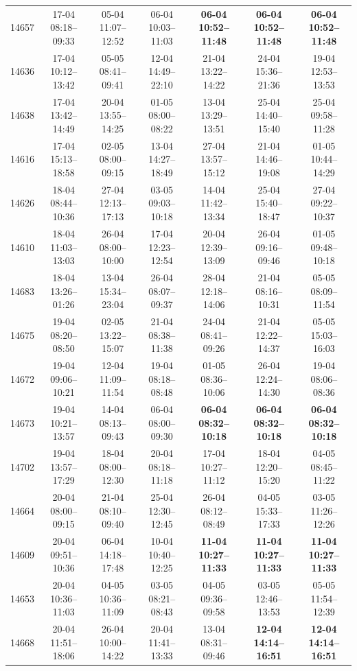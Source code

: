 \begin{table}[htbp]
\begin{tabular}{|r|c|c|c|c|c|c|}
14657 & 17-04 08:18--09:33 & 05-04 11:07--12:52 & 06-04 10:03--11:03 & \textbf{06-04 10:52--11:48} & \textbf{06-04 10:52--11:48} & \textbf{06-04 10:52--11:48} \\ 
14636 & 17-04 10:12--13:42 & 05-05 08:41--09:41 & 12-04 14:49--22:10 & 21-04 13:22--14:22 & 24-04 15:36--21:36 & 19-04 12:53--13:53 \\ 
14638 & 17-04 13:42--14:49 & 20-04 13:55--14:25 & 01-05 08:00--08:22 & 13-04 13:29--13:51 & 25-04 14:40--15:40 & 25-04 09:58--11:28 \\ 
14616 & 17-04 15:13--18:58 & 02-05 08:00--09:15 & 13-04 14:27--18:49 & 27-04 13:57--15:12 & 21-04 14:46--19:08 & 01-05 10:44--14:29 \\ 
14626 & 18-04 08:44--10:36 & 27-04 12:13--17:13 & 03-05 09:03--10:18 & 14-04 11:42--13:34 & 25-04 15:40--18:47 & 27-04 09:22--10:37 \\ 
14610 & 18-04 11:03--13:03 & 26-04 08:00--10:00 & 17-04 12:23--12:54 & 20-04 12:39--13:09 & 26-04 09:16--09:46 & 01-05 09:48--10:18 \\ 
14683 & 18-04 13:26--01:26 & 13-04 15:34--23:04 & 26-04 08:07--09:37 & 28-04 12:18--14:06 & 21-04 08:16--10:31 & 05-05 08:09--11:54 \\ 
14675 & 19-04 08:20--08:50 & 02-05 13:22--15:07 & 21-04 08:38--11:38 & 24-04 08:41--09:26 & 21-04 12:22--14:37 & 05-05 15:03--16:03 \\ 
14672 & 19-04 09:06--10:21 & 12-04 11:09--11:54 & 19-04 08:18--08:48 & 01-05 08:36--10:06 & 26-04 12:24--14:30 & 19-04 08:06--08:36 \\ 
14673 & 19-04 10:21--13:57 & 14-04 08:13--09:43 & 06-04 08:00--09:30 & \textbf{06-04 08:32--10:18} & \textbf{06-04 08:32--10:18} & \textbf{06-04 08:32--10:18} \\ 
14702 & 19-04 13:57--17:29 & 18-04 08:00--12:30 & 20-04 08:18--11:18 & 17-04 10:27--11:12 & 18-04 12:20--15:20 & 04-05 08:45--11:22 \\ 
14664 & 20-04 08:00--09:15 & 21-04 08:10--09:40 & 25-04 12:30--12:45 & 26-04 08:12--08:49 & 04-05 15:33--17:33 & 03-05 11:26--12:26 \\ 
14609 & 20-04 09:51--10:36 & 06-04 14:18--17:48 & 10-04 10:40--12:25 & \textbf{11-04 10:27--11:33} & \textbf{11-04 10:27--11:33} & \textbf{11-04 10:27--11:33} \\ 
14653 & 20-04 10:36--11:03 & 04-05 10:36--11:09 & 03-05 08:21--08:43 & 04-05 09:36--09:58 & 03-05 12:46--13:53 & 05-05 11:54--12:39 \\ 
14668 & 20-04 11:51--18:06 & 26-04 10:00--14:22 & 20-04 11:41--13:33 & 13-04 08:31--09:46 & \textbf{12-04 14:14--16:51} & \textbf{12-04 14:14--16:51} \\ 

\end{tabular}
\end{table}
